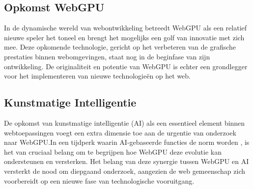 




\subsection{Opkomst WebGPU}
In de dynamische wereld van webontwikkeling betreedt WebGPU als een relatief nieuwe speler het toneel en brengt het mogelijks een golf van innovatie met zich mee. Deze opkomende technologie, gericht op het verbeteren van de grafische prestaties binnen webomgevingen, staat nog in de beginfase van zijn ontwikkeling. De originaliteit en potentie van WebGPU is echter een grondlegger voor het implementeren van nieuwe technologieën op het web.

\subsection{Kunstmatige Intelligentie}
De opkomst van kunstmatige intelligentie (AI) als een essentieel element binnen webtoepassingen voegt een extra dimensie toe aan de urgentie van onderzoek naar WebGPU.\@ In een tijdperk waarin AI-gebaseerde functies de norm worden \textcite{QuantumBlack2022}, is het van cruciaal belang om te begrijpen hoe WebGPU deze evolutie kan ondersteunen en versterken. Het belang van deze synergie tussen WebGPU en AI versterkt de nood om diepgaand onderzoek, aangezien de web gemeenschap zich voorbereidt op een nieuwe fase van technologische vooruitgang. \autocite{Gu2023}

